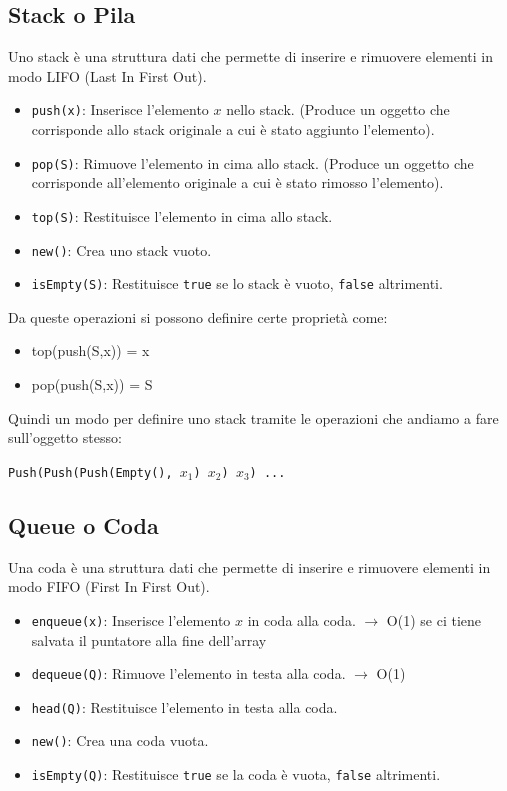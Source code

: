 \documentclass[a4paper]{article}
\begin{document}
\subsection{Stack o Pila}
\begin{definition}
  Uno stack è una struttura dati che permette di inserire e rimuovere elementi in modo LIFO (Last In First Out).
  \begin{itemize}
      \item \texttt{push(x)}: Inserisce l'elemento \( x \) nello stack.
      (Produce un oggetto che corrisponde allo stack originale a cui è stato aggiunto l'elemento).
      \item \texttt{pop(S)}: Rimuove l'elemento in cima allo stack. (Produce un oggetto che corrisponde all'elemento originale a cui è stato rimosso l'elemento).
      \item \texttt{top(S)}: Restituisce l'elemento in cima allo stack.
      \item \texttt{new()}: Crea uno stack vuoto.
      \item \texttt{isEmpty(S)}: Restituisce \texttt{true} se lo stack è vuoto, \texttt{false} altrimenti.
  \end{itemize}
\end{definition}

Da queste operazioni si possono definire certe proprietà come:

\begin{itemize}
  \item top(push(S,x)) = x
  \item pop(push(S,x)) = S
\end{itemize}
Quindi un modo per definire uno stack tramite le operazioni che andiamo a fare sull'oggetto stesso:

\begin{center}
\texttt{Push(Push(Push(Empty(), $x_1$) $x_2$) $x_3$) ...}
\end{center}

\subsection{Queue o Coda}

\begin{definition}
  Una coda è una struttura dati che permette di inserire e rimuovere elementi in modo FIFO (First In First Out).
  \begin{itemize}
      \item \texttt{enqueue(x)}: Inserisce l'elemento \( x \) in coda alla coda. $\longrightarrow$ O(1) se ci tiene salvata il puntatore alla fine dell'array
      \item \texttt{dequeue(Q)}: Rimuove l'elemento in testa alla coda. $\longrightarrow$ O(1)
      \item \texttt{head(Q)}: Restituisce l'elemento in testa alla coda.
      \item \texttt{new()}: Crea una coda vuota.
      \item \texttt{isEmpty(Q)}: Restituisce \texttt{true} se la coda è vuota, \texttt{false} altrimenti.
  \end{itemize}
\end{definition}
\end{document}
